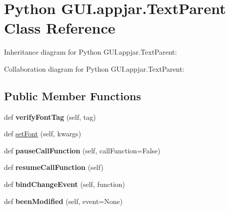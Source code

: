 \hypertarget{class_python_01_g_u_i_1_1appjar_1_1_text_parent}{}\section{Python G\+U\+I.\+appjar.\+Text\+Parent Class Reference}
\label{class_python_01_g_u_i_1_1appjar_1_1_text_parent}


Inheritance diagram for Python G\+U\+I.\+appjar.\+Text\+Parent\+:


Collaboration diagram for Python G\+U\+I.\+appjar.\+Text\+Parent\+:
\subsection*{Public Member Functions}
\begin{DoxyCompactItemize}
\item 
\mbox{\label{class_python_01_g_u_i_1_1appjar_1_1_text_parent_a9eae0fae60b35b2417f6d1c43faf9e15}} 
def {\bfseries verify\+Font\+Tag} (self, tag)
\item 
def \hyperlink{class_python_01_g_u_i_1_1appjar_1_1_text_parent_afc89ac1ab138115c2ca21d8149b5164d}{set\+Font} (self, kwargs)
\item 
\mbox{\label{class_python_01_g_u_i_1_1appjar_1_1_text_parent_a25e0fdf4e9f2188b658f727ad9bc684c}} 
def {\bfseries pause\+Call\+Function} (self, call\+Function=False)
\item 
\mbox{\label{class_python_01_g_u_i_1_1appjar_1_1_text_parent_abc3f7b4303983bc39d26de6a983189c5}} 
def {\bfseries resume\+Call\+Function} (self)
\item 
\mbox{\label{class_python_01_g_u_i_1_1appjar_1_1_text_parent_ab8337a03f7052ea8de6c989c9eb644bd}} 
def {\bfseries bind\+Change\+Event} (self, function)
\item 
\mbox{\label{class_python_01_g_u_i_1_1appjar_1_1_text_parent_a772dcfb1b1750182944d306d079140ef}} 
def {\bfseries been\+Modified} (self, event=None)
\item 

\end{DoxyCompactItemize}
